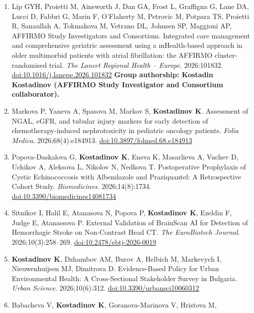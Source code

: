 \documentclass[
  10.5pt,
  a4paper,
  DIV=11,
  numbers=noendperiod]{scrartcl}
\begin{document}
\begin{enumerate}
  in Bulgaria, 2021--2025: A National Payer-Perspective Expenditure
  Analysis. \emph{Healthcare}. 2026;14(16):2474.
  \href{https://doi.org/10.3390/healthcare14162474}{doi:10.3390/healthcare14162474}
\item
  Lip GYH, Proietti M, Ainsworth J, Dan GA, Frost L, Graffigna G, Lane
  DA, Lucci D, Fabbri G, Marin F, O'Flaherty M, Petrovic M, Potpara TS,
  Proietti R, Sanaullah A, Tokmakova M, Vetrano DL, Johnsen SP, Maggioni
  AP, AFFIRMO Study Investigators and Consortium. Integrated care
  management and comprehensive geriatric assessment using a
  mHealth-based approach in older multimorbid patients with atrial
  fibrillation: the AFFIRMO cluster-randomised trial. \emph{The Lancet
  Regional Health -- Europe}. 2026:101832.
  \href{https://doi.org/10.1016/j.lanepe.2026.101832}{doi:10.1016/j.lanepe.2026.101832}
  \textbf{Group authorship: Kostadin Kostadinov (AFFIRMO Study
  Investigator and Consortium collaborator).}
\item
  Markova P, Yaneva A, Spasova M, Markov S, \textbf{Kostadinov K}.
  Assessment of NGAL, eGFR, and tubular injury markers for early
  detection of chemotherapy-induced nephrotoxicity in pediatric oncology
  patients. \emph{Folia Medica}. 2026;68(4):e184913.
  \href{https://doi.org/10.3897/folmed.68.e184913}{doi:10.3897/folmed.68.e184913}
\item
  Popova-Daskalova G, \textbf{Kostadinov K}, Eneva K, Masarlieva A,
  Vuchev D, Uchikov A, Aleksova L, Nikolov N, Nedkova T. Postoperative
  Prophylaxis of Cystic Echinococcosis with Albendazole and
  Praziquantel: A Retrospective Cohort Study. \emph{Biomedicines}.
  2026;14(8):1734.
  \href{https://doi.org/10.3390/biomedicines14081734}{doi:10.3390/biomedicines14081734}
\item
  Sitnikov I, Halil E, Atanasova N, Popova P, \textbf{Kostadinov K},
  Ezeldin F, Judge E, Atanassova P. External Validation of BrainScan AI
  for Detection of Hemorrhagic Stroke on Non-Contrast Head CT. \emph{The
  EuroBiotech Journal}. 2026;10(3):258--269.
  \href{https://doi.org/10.2478/ebtj-2026-0019}{doi:10.2478/ebtj-2026-0019}
\item
  \textbf{Kostadinov K}, Dzhambov AM, Burov A, Helbich M, Markevych I,
  Nieuwenhuijsen MJ, Dimitrova D. Evidence-Based Policy for Urban
  Environmental Health: A Cross-Sectional Stakeholder Survey in
  Bulgaria. \emph{Urban Science}. 2026;10(6):312.
  \href{https://doi.org/10.3390/urbansci10060312}{doi:10.3390/urbansci10060312}
\item
  Babacheva V, \textbf{Kostadinov K}, Goranova-Marinova V, Hristova M,

\end{enumerate}
\end{document}
